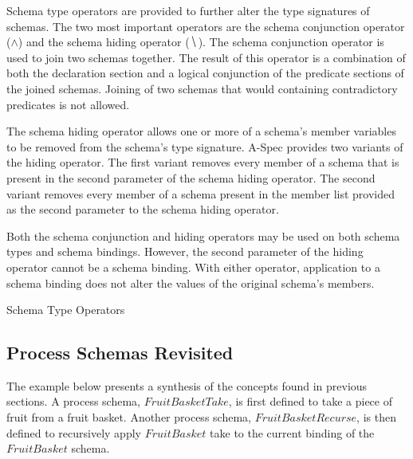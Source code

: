 \documentclass[letterpaper,10pt,draft]{book}
\begin{document}
Schema type operators are provided to further alter the type signatures of schemas.
The two most important operators are the schema conjunction operator ($\land$) and
the schema hiding operator ($\hide$).  The schema conjunction operator is used to
join two schemas together.  The result of this operator is a combination of both
the declaration section and a logical conjunction of the predicate sections of the
joined schemas.  Joining of two schemas that would containing contradictory predicates
is not allowed.

The schema hiding operator allows one or more of a schema's member variables to
be removed from the schema's type signature.  A-Spec provides two variants of the
hiding operator.  The first variant removes every member of a schema that is present
in the second parameter of the schema hiding operator.  The second variant removes
every member of a schema present in the member list provided as the second parameter
to the schema hiding operator.

Both the schema conjunction and hiding operators may be used on both schema types
and schema bindings.  However, the second parameter of the hiding operator cannot
be a schema binding.  With either operator, application to a schema binding does
not alter the values of the original schema's members.

\begin{example}
\begin{minipage}[t]{0.51\linewidth}
   
\end{minipage}
\begin{minipage}[t]{0.48\linewidth}
   \azsch
   
\end{minipage}

   \caption{Schema Type Operators}
   \label{ex:SchTypeOp}
\end{example}

\subsection{Process Schemas Revisited}
   \label{sect:SchProcRevist}

The example below presents a synthesis of the concepts found in previous sections.
A process schema, $FruitBasketTake$, is first defined to take a piece of fruit from
a fruit basket.  Another process schema, $FruitBasketRecurse$, is then defined to
recursively apply $FruitBasket$ take to the current binding of the $FruitBasket$
schema.
\end{document}
